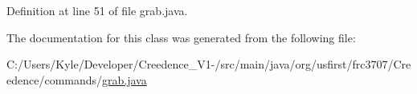 Definition at line 51 of file grab.\+java.



The documentation for this class was generated from the following file\+:\begin{DoxyCompactItemize}
\item 
C\+:/\+Users/\+Kyle/\+Developer/\+Creedence\+\_\+\+V1-\//src/main/java/org/usfirst/frc3707/\+Creedence/commands/\mbox{\hyperlink{grab_8java}{grab.\+java}}\end{DoxyCompactItemize}
